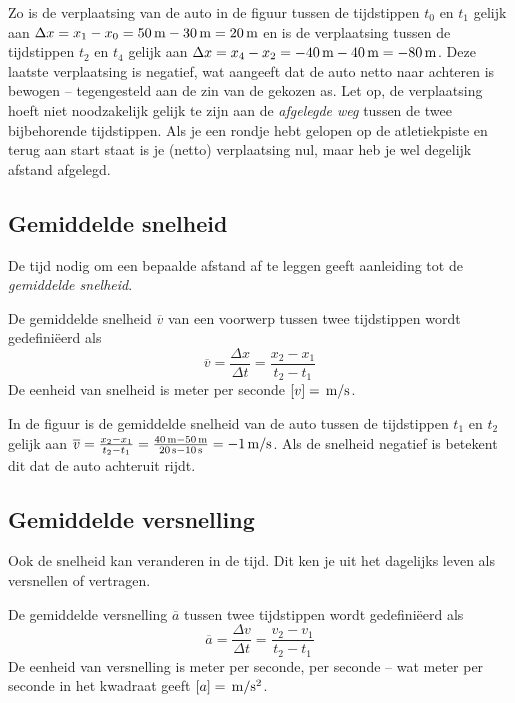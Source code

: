 \documentclass{ximera}
\begin{document}
Zo is de verplaatsing van de auto in de figuur tussen de tijdstippen $t_0$ en $t_1$ gelijk aan $\Delta x = x_1-x_0=50\rm\,m-30\rm\,m=20\rm\,m$ en is de verplaatsing tussen de tijdstippen $t_2$ en $t_4$ gelijk aan $\Delta x=x_4-x_2=-40\rm\,m-40\rm\,m=-80\rm\,m$. Deze laatste verplaatsing is negatief, wat aangeeft dat de auto netto naar achteren is bewogen -- tegengesteld aan de zin van de gekozen as.
Let op, de verplaatsing hoeft niet noodzakelijk gelijk te zijn aan de \emph{afgelegde weg} tussen de twee bijbehorende tijdstippen. Als je een rondje hebt gelopen op de atletiekpiste en terug aan start staat is je (netto) verplaatsing nul, maar heb je wel degelijk afstand afgelegd.

\subsection{Gemiddelde snelheid}


De tijd nodig om een bepaalde afstand af te leggen geeft aanleiding tot de \textit{gemiddelde snelheid}. 


\begin{definition}
	
De gemiddelde snelheid $\overline{v}$ van een voorwerp tussen twee tijdstippen wordt gedefiniëerd als
\[
\overline{v}=\frac{\Delta x}{\Delta t}=\frac{x_2-x_1}{t_2-t_1}
\]
De eenheid van snelheid is meter per seconde $[v]=\rm\,m/s$. 
\end{definition}

In de figuur is de gemiddelde snelheid van de auto tussen de tijdstippen $t_1$ en $t_2$ gelijk aan $\overline{v}=\frac{x_2-x_1}{t_2-t_1}=\frac{40\rm\,m-50\rm\,m}{20\rm\,s-10\rm\,s}=-1\rm\,m/s$. Als de snelheid negatief is betekent dit dat de auto achteruit rijdt.



\subsection{Gemiddelde versnelling}

Ook de snelheid kan veranderen in de tijd. Dit ken je uit het dagelijks leven als versnellen of vertragen.

\begin{definition}

De gemiddelde versnelling \(\overline{a}\) tussen twee tijdstippen wordt gedefiniëerd als
\[
\overline{a}=\frac{\Delta v}{\Delta t}=\frac{v_2-v_1}{t_2-t_1}
\]
De eenheid van versnelling is meter per seconde, per seconde -- wat meter per seconde in het kwadraat geeft $[a]=\rm\,m/s^2$.
\end{definition}
\end{document}
